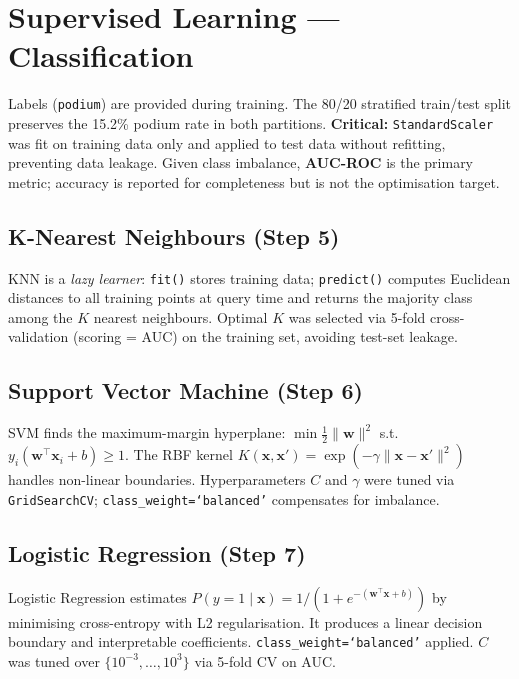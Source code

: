 \documentclass[11pt,a4paper]{article}
\begin{document}
\section{Supervised Learning --- Classification}

Labels (\texttt{podium}) are provided during training. The 80/20 stratified
train/test split preserves the 15.2\% podium rate in both partitions.
\textbf{Critical:} \texttt{StandardScaler} was fit on training data only and
applied to test data without refitting, preventing data leakage. Given class
imbalance, \textbf{AUC-ROC} is the primary metric; accuracy is reported for
completeness but is not the optimisation target.

\subsection{K-Nearest Neighbours (Step 5)}

KNN is a \textit{lazy learner}: \texttt{fit()} stores training data; \texttt{predict()}
computes Euclidean distances to all training points at query time and returns the
majority class among the $K$ nearest neighbours. Optimal $K$ was selected via
5-fold cross-validation (scoring = AUC) on the training set, avoiding test-set leakage.

\subsection{Support Vector Machine (Step 6)}

SVM finds the maximum-margin hyperplane:
$\min\frac{1}{2}\|\mathbf{w}\|^2$ s.t.\ $y_i(\mathbf{w}^\top\mathbf{x}_i+b)\geq 1$.
The RBF kernel $K(\mathbf{x},\mathbf{x}')=\exp(-\gamma\|\mathbf{x}-\mathbf{x}'\|^2)$
handles non-linear boundaries. Hyperparameters $C$ and $\gamma$ were tuned via
\texttt{GridSearchCV}; \texttt{class\_weight=`balanced'} compensates for imbalance.

\subsection{Logistic Regression (Step 7)}

Logistic Regression estimates $P(y{=}1\mid\mathbf{x}) = 1/(1+e^{-(\mathbf{w}^\top\mathbf{x}+b)})$
by minimising cross-entropy with L2 regularisation. It produces a linear decision
boundary and interpretable coefficients. \texttt{class\_weight=`balanced'} applied.
$C$ was tuned over $\{10^{-3},\dots,10^{3}\}$ via 5-fold CV on AUC.
\end{document}
